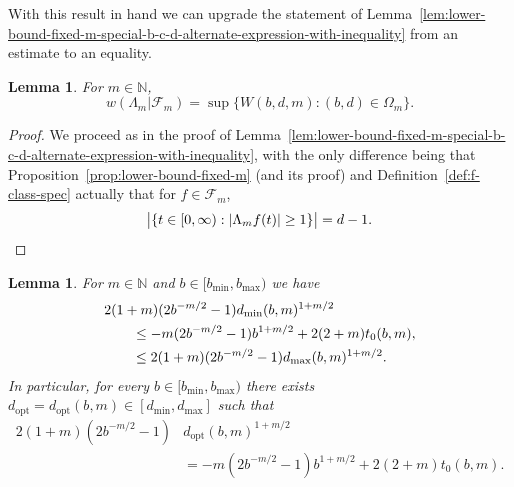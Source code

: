 \documentclass[a4paper]{amsart} %
\newtheorem{lemma}[theorem]{Lemma}
\theoremstyle{definition}
\theoremstyle{remark}
\numberwithin{equation}{section}
\newcommand*{\NN}{\mathbb{N}}
\newcommand*{\NNone}{\mathbb{N}}
\newcommand*{\weakconstrestricted}[2]{w(#1|#2)} %
\newcommand*{\fclassspec}[1]{\mathcal{F}_{#1}}
\newcommand*{\specialbd}[1]{\Omega_{#1}}
\newcommand*{\XXXspecialbd}{W}
\newcommand*{\bMin}{b_{\min}}
\newcommand*{\bMax}{b_{\max}}
\newcommand*{\dMin}{d_{\min}}
\newcommand*{\dMax}{d_{\max}}
\newcommand*{\dOpt}{d_{\mathrm{opt}}}
\begin{document}
With this result in hand we can upgrade the statement of Lemma~\ref{lem:lower-bound-fixed-m-special-b-c-d-alternate-expression-with-inequality}
from an estimate to an equality.

\begin{lemma}
	\label{lem:lower-bound-fixed-m-special-b-c-d-alternate-expression}
	For $m\in\NNone$,
	\begin{equation*}
	\weakconstrestricted{\Lambda_m}{\fclassspec{m}} 
	=  
	\sup\bigl\{
	\XXXspecialbd(b,d,m) : (b,d)\in\specialbd{m} \bigr\}.
	\end{equation*}
\end{lemma}

\begin{proof}
	We proceed as in the proof of Lemma~\ref{lem:lower-bound-fixed-m-special-b-c-d-alternate-expression-with-inequality},
	with the only difference being that Proposition~\ref{prop:lower-bound-fixed-m} (and its proof)
	and Definition~\ref{def:f-class-spec} actually  that for $f\in\fclassspec{m}$,
	\begin{equation*}
	\bigl|\{t\in[0,\infty) : |\Lambda_m f(t)|\geq 1\} \bigr| 
	= d-1.
	\qedhere
	\end{equation*}
\end{proof}
\begin{lemma}
	\label{lem:dOpt-definition}
	For $m\in\NN$ and $b\in [\bMin, \bMax)$ we have
	\begin{align*}
	\MoveEqLeft[2]
	2(1+m)(2b^{-m/2} -1) \dMin(b,m)^{1+m/2} \\
	&\leq -m(2b^{-m/2} - 1) b^{1+m/2}  
	+ 2(2+m) t_0(b,m),\\
	&\leq 2(1+m)(2b^{-m/2} -1) \dMax(b,m)^{1+m/2}.
	\end{align*}	
	In particular, for every $b\in [\bMin, \bMax)$
	there exists  $\dOpt= \dOpt(b,m)\in [\dMin, \dMax]$ 
	such that
	\begin{align}
	\label{eq:fixed-m-supremum-W-optimal-curve}
	2(1+m)(2b^{-m/2} -1) & \dOpt(b,m)^{1+m/2} \\
	&= -m(2b^{-m/2} - 1) b^{1+m/2}  %
	+ 2(2+m) t_0(b,m). \nonumber
	\end{align}	
\end{lemma}
\end{document}
